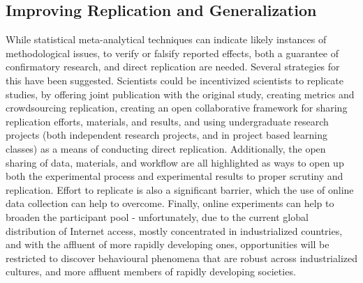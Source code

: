 \documentclass[12pt,a4paper,titlepage]{scrreprt}
\begin{document}
\subsection{Improving Replication and Generalization}
While statistical meta-analytical techniques can indicate likely instances of methodological issues, to verify or falsify reported effects, both a guarantee of confirmatory research, and direct replication are needed. Several strategies for this have been suggested. Scientists could be incentivized scientists to replicate studies, by offering joint publication with the original study\cite{koole_rewarding_2012}, creating metrics and crowdsourcing replication\cite{nosek_scientific_2012}, creating an open collaborative framework for sharing replication efforts, materials, and results\cite{collaboration_open_2012}, and using undergraduate research projects (both independent research projects, and in project based learning classes) as a means of conducting direct replication\cite{grahe_harnessing_2012,frank_teaching_2012}. Additionally, the open sharing of data, materials, and workflow\cite{giner-sorolla_science_2012,nosek_scientific_2012,miguel_promoting_2014} are all highlighted as ways to open up both the experimental process and experimental results to proper scrutiny and replication. Effort to replicate is also a significant barrier, which the use of online data collection can help to overcome\cite{grahe_harnessing_2012}.
Finally, online experiments can help to broaden the participant pool\cite{gosling_wired_2010} - unfortunately, due to the current global distribution of Internet access, mostly concentrated in industrialized countries, and with the affluent of more rapidly developing ones, opportunities will be restricted to discover behavioural phenomena that are robust across industrialized cultures, and more affluent members of rapidly developing societies.
\end{document}
